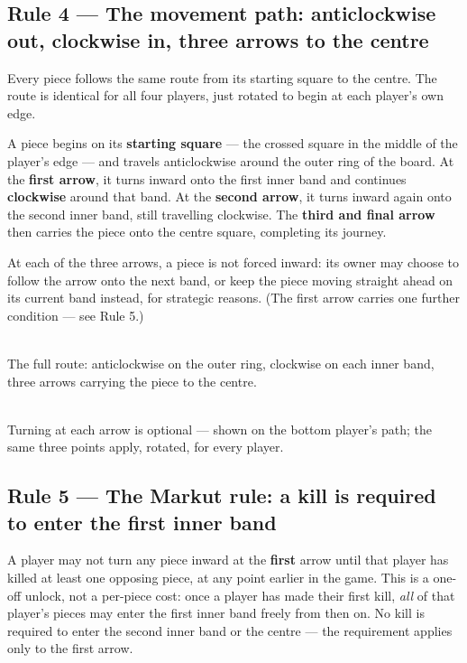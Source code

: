 \documentclass[10pt,a4paper]{article}
\newcommand{\ruletitle}[2]{\subsection*{Rule #1 --- #2}}
\begin{document}
\newpage
\ruletitle{4}{The movement path: anticlockwise out, clockwise in, three arrows to the centre}

Every piece follows the same route from its starting square to the centre.
The route is identical for all four players, just rotated to begin at each
player's own edge.

A piece begins on its \textbf{starting square} --- the crossed square in the
middle of the player's edge --- and travels anticlockwise around the outer
ring of the board. At the \textbf{first arrow}, it turns inward onto the
first inner band and continues \textbf{clockwise} around that band. At the
\textbf{second arrow}, it turns inward again onto the second inner band,
still travelling clockwise. The \textbf{third and final arrow} then carries
the piece onto the centre square, completing its journey.

At each of the three arrows, a piece is not forced inward: its owner may
choose to follow the arrow onto the next band, or keep the piece moving
straight ahead on its current band instead, for strategic reasons. (The
first arrow carries one further condition --- see Rule 5.)

\begin{center}
\begin{minipage}{0.45\textwidth}
  \centering
  \\[1mm]
  {\small The full route: anticlockwise on the outer ring, clockwise on
  each inner band, three arrows carrying the piece to the centre.}
\end{minipage}%
\hspace{0.02\textwidth}
\begin{minipage}{0.45\textwidth}
  \centering
  \\[1mm]
  {\small Turning at each arrow is optional --- shown on the bottom
  player's path; the same three points apply, rotated, for every player.}
\end{minipage}
\end{center}

\ruletitle{5}{The Markut rule: a kill is required to enter the first inner band}

A player may not turn any piece inward at the \textbf{first} arrow until
that player has killed at least one opposing piece, at any point
earlier in the game. This is a one-off unlock, not a per-piece cost: once a
player has made their first kill, \emph{all} of that player's pieces may
enter the first inner band freely from then on. No kill is required to enter
the second inner band or the centre --- the requirement applies only to the
first arrow.
\end{document}
